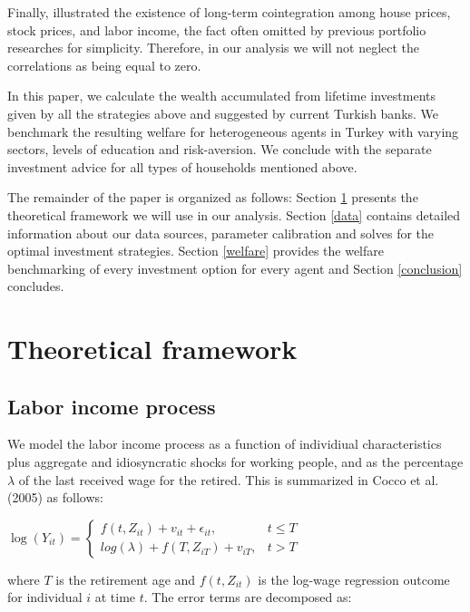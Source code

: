 \documentclass[]{elsarticle}
\begin{document}
Finally, \citet{ascheberg} illustrated the existence of long-term cointegration among house prices, stock prices, and labor income, the fact often omitted by previous portfolio researches for simplicity. Therefore, in our analysis we will not neglect the correlations as being equal to zero. 

In this paper, we calculate the wealth accumulated from lifetime investments given by all the strategies above and suggested by current Turkish banks. We benchmark the resulting welfare for heterogeneous agents in Turkey with varying sectors, levels of education and risk-aversion. We conclude with the separate investment advice for all types of households mentioned above.

The remainder of the paper is organized as follows: Section \ref{model} presents the theoretical framework we will use in our analysis. Section \ref{data} contains detailed information about our data sources, parameter calibration and solves for the optimal investment strategies. Section \ref{welfare} provides the welfare benchmarking of every investment option for every agent and Section \ref{conclusion} concludes.


\section{Theoretical framework}
\label{model}
\subsection{Labor income process}

We model the labor income process as a function of individiual characteristics plus aggregate and idiosyncratic shocks for working people, and as the percentage $\lambda$ of the last received wage for the retired. This is summarized in Cocco et al. (2005) as follows:

\begin{center}
	$\log(Y_{it}) =
		\begin{cases}
			f(t,Z_{it}) + v_{it} + \epsilon_{it}, & t \leq T \\
			log(\lambda) + f(T, Z_{iT}) + v_{iT}, & t > T
		\end{cases}
	$
\end{center}

where $T$ is the retirement age and $f(t, Z_{it})$ is the log-wage regression outcome for individual $i$ at time $t$. The error terms are decomposed as:
\end{document}
